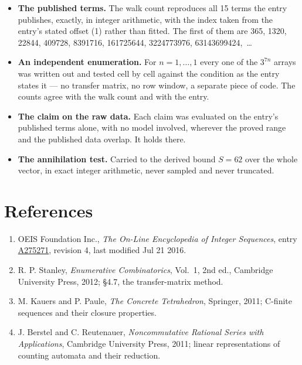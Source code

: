 \documentclass[11pt]{article}
\theoremstyle{definition}
\begin{document}
\begin{itemize}

\item {\bfseries The published terms.} The walk count reproduces all 15 terms the entry publishes, exactly, in integer arithmetic, with the index taken from the entry's stated offset (1) rather than fitted. The first of them are 365, 1320, 22844, 409728, 8391716, 161725644, 3224773976, 63143699424,~\dots

\item {\bfseries An independent enumeration.} For $n = 1,\dots,1$ every one of the $3^{7n}$ arrays was written out and tested cell by cell against the condition as the entry states it --- no transfer matrix, no row window, a separate piece of code. The counts agree with the walk count and with the entry.

\item {\bfseries The claim on the raw data.} Each claim was evaluated on the entry's published terms alone, with no model involved, wherever the proved range and the published data overlap. It holds there.

\item {\bfseries The annihilation test.} Carried to the derived bound $S = 62$ over the whole vector, in exact integer arithmetic, never sampled and never truncated.

\end{itemize}

\section{References}

\begin{enumerate}

\item OEIS Foundation Inc., \emph{The On-Line Encyclopedia of Integer Sequences}, entry \href{https://oeis.org/A275271}{A275271}, revision 4, last modified Jul 21 2016.

\item R. P. Stanley, \emph{Enumerative Combinatorics}, Vol.~1, 2nd ed., Cambridge University Press, 2012; \S4.7, the transfer-matrix method.

\item M. Kauers and P. Paule, \emph{The Concrete Tetrahedron}, Springer, 2011; C-finite sequences and their closure properties.

\item J. Berstel and C. Reutenauer, \emph{Noncommutative Rational Series with Applications}, Cambridge University Press, 2011; linear representations of counting automata and their reduction.

\end{enumerate}
\end{document}
